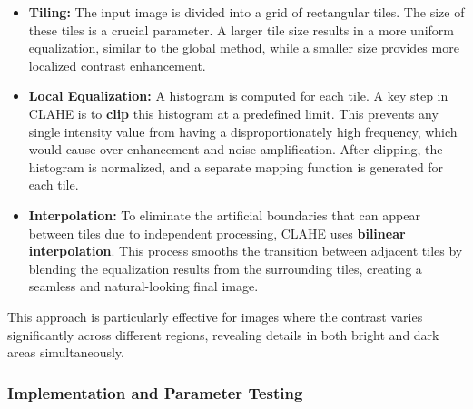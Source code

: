 \documentclass[11pt]{article}
\begin{document}
\begin{itemize}
\item
  \textbf{Tiling:} The input image is divided into a grid of rectangular
  tiles. The size of these tiles is a crucial parameter. A larger tile
  size results in a more uniform equalization, similar to the global
  method, while a smaller size provides more localized contrast
  enhancement.
\item
  \textbf{Local Equalization:} A histogram is computed for each tile. A
  key step in CLAHE is to \textbf{clip} this histogram at a predefined
  limit. This prevents any single intensity value from having a
  disproportionately high frequency, which would cause over-enhancement
  and noise amplification. After clipping, the histogram is normalized,
  and a separate mapping function is generated for each tile.
\item
  \textbf{Interpolation:} To eliminate the artificial boundaries that
  can appear between tiles due to independent processing, CLAHE uses
  \textbf{bilinear interpolation}. This process smooths the transition
  between adjacent tiles by blending the equalization results from the
  surrounding tiles, creating a seamless and natural-looking final
  image.
\end{itemize}

This approach is particularly effective for images where the contrast
varies significantly across different regions, revealing details in both
bright and dark areas simultaneously.

    \hypertarget{implementation-and-parameter-testing}{%
\subsubsection{Implementation and Parameter
Testing}\label{implementation-and-parameter-testing}}
\end{document}
